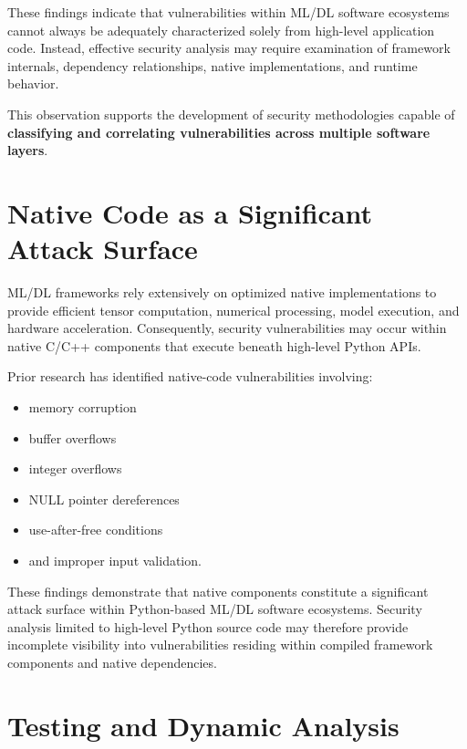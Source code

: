 \documentclass[
  12pt,
  letterpaper,
  oneside]{report}
\providecommand{\tightlist}{%
  \setlength{\itemsep}{0pt}\setlength{\parskip}{0pt}}
\begin{document}
These findings indicate that vulnerabilities within ML/DL software
ecosystems cannot always be adequately characterized solely from
high-level application code. Instead, effective security analysis may
require examination of framework internals, dependency relationships,
native implementations, and runtime behavior.
\cite{harzevili2023characterizing,lai2025security,zhou2025unraveling}

This observation supports the development of security methodologies
capable of \textbf{classifying and correlating vulnerabilities across
multiple software layers}.

\section{Native Code as a Significant Attack Surface}\label{84-native-code-as-a-significant-attack-surface}

ML/DL frameworks rely extensively on optimized native implementations to
provide efficient tensor computation, numerical processing, model
execution, and hardware acceleration. Consequently, security
vulnerabilities may occur within native C/C++ components that execute
beneath high-level Python APIs.

Prior research has identified native-code vulnerabilities involving:

\begin{itemize}
\tightlist
\item
  memory corruption
\item
  buffer overflows
\item
  integer overflows
\item
  NULL pointer dereferences
\item
  use-after-free conditions
\item
  and improper input validation.
\end{itemize}
\cite{xiao2018security,filus2023software,ning2024binarysca}

These findings demonstrate that native components constitute a
significant attack surface within Python-based ML/DL software
ecosystems. Security analysis limited to high-level Python source code
may therefore provide incomplete visibility into vulnerabilities
residing within compiled framework components and native dependencies.

\section{Testing and Dynamic Analysis}\label{85-testing-and-dynamic-analysis}
\end{document}

